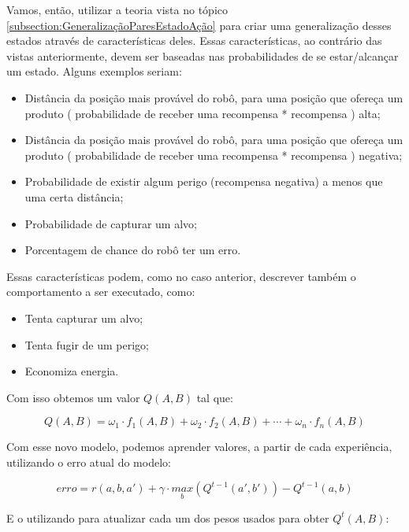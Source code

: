 Vamos, então, utilizar a teoria vista no tópico \ref{subsection:GeneralizaçãoParesEstadoAção} para criar uma generalização desses estados através de características deles. Essas características, ao contrário das vistas anteriormente, devem ser baseadas nas probabilidades de se estar/alcançar um estado. Alguns exemplos seriam:

\begin{itemize}
	\item Distância da posição mais provável do robô, para uma posição que ofereça um produto ( probabilidade de receber uma recompensa * recompensa ) alta;
	\item Distância da posição mais provável do robô, para uma posição que ofereça um produto ( probabilidade de receber uma recompensa * recompensa ) negativa;
	\item Probabilidade de existir algum perigo (recompensa negativa) a menos que uma certa distância;
	\item Probabilidade de capturar um alvo;
	\item Porcentagem de chance do robô ter um erro.
\end{itemize}

Essas características podem, como no caso anterior, descrever também o comportamento a ser executado, como:

\begin{itemize}
	\item Tenta capturar um alvo;
	\item Tenta fugir de um perigo;
	\item Economiza energia.
\end{itemize}

Com isso obtemos um valor $ Q \left( A, B \right) $ tal que:

\begin{equation}
	Q \left( A, B \right) = \omega_1 \cdot f_1 \left( A, B \right) + \omega_2 \cdot f_2 \left( A, B \right) + \cdots + \omega_n \cdot f_n \left( A, B \right)
\end{equation}


Com esse novo modelo, podemos aprender valores, a partir de cada experiência, utilizando o erro atual do modelo:

\begin{equation}
	erro = r \left( a, b, a' \right) + \gamma \cdot \underset{b}{max} \left( Q^{t-1} \left( a', b' \right) \right) - Q^{t-1} \left( a, b \right)
\end{equation}

E o utilizando para atualizar cada um dos pesos usados para obter $ Q^t \left( A, B \right) $:

